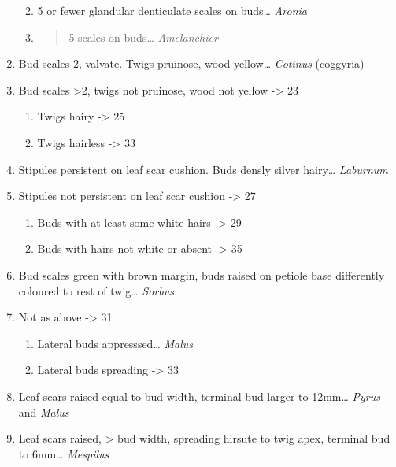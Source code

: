 \documentclass[openany]{book}
\providecommand{\tightlist}{%
  \setlength{\itemsep}{0pt}\setlength{\parskip}{0pt}}
\begin{document}
\begin{enumerate}
  \begin{enumerate}
  \def\labelenumii{\arabic{enumii}.}
  \setcounter{enumii}{18}
  \item
    5 or fewer glandular denticulate scales on buds\ldots{}
    \emph{Aronia}
  \item
    \begin{quote}
    5 scales on buds\ldots{} \emph{Amelanchier}
    \end{quote}
  \end{enumerate}
\item
  Bud scales 2, valvate. Twigs pruinose, wood yellow\ldots{}
  \emph{Cotinus} (coggyria)
\item
  Bud scales \textgreater{}2, twigs not pruinose, wood not yellow
  -\textgreater{} 23

  \begin{enumerate}
  \def\labelenumii{\arabic{enumii}.}
  \setcounter{enumii}{22}
  \tightlist
  \item
    Twigs hairy -\textgreater{} 25
  \item
    Twigs hairless -\textgreater{} 33
  \end{enumerate}
\item
  Stipules persistent on leaf scar cushion. Buds densly silver
  hairy\ldots{} \emph{Laburnum}
\item
  Stipules not persistent on leaf scar cushion -\textgreater{} 27

  \begin{enumerate}
  \def\labelenumii{\arabic{enumii}.}
  \setcounter{enumii}{26}
  \tightlist
  \item
    Buds with at least some white hairs -\textgreater{} 29
  \item
    Buds with hairs not white or absent -\textgreater{} 35
  \end{enumerate}
\item
  Bud scales green with brown margin, buds raised on petiole base
  differently coloured to rest of twig\ldots{} \emph{Sorbus}
\item
  Not as above -\textgreater{} 31

  \begin{enumerate}
  \def\labelenumii{\arabic{enumii}.}
  \setcounter{enumii}{30}
  \tightlist
  \item
    Lateral buds appresssed\ldots{} \emph{Malus}
  \item
    Lateral buds spreading -\textgreater{} 33
  \end{enumerate}
\item
  Leaf scars raised equal to bud width, terminal bud larger to
  12mm\ldots{} \emph{Pyrus} and \emph{Malus}
\item
  Leaf scars raised, \textgreater{} bud width, spreading hirsute to twig
  apex, terminal bud to 6mm\ldots{} \emph{Mespilus}


\end{enumerate}
\end{document}
